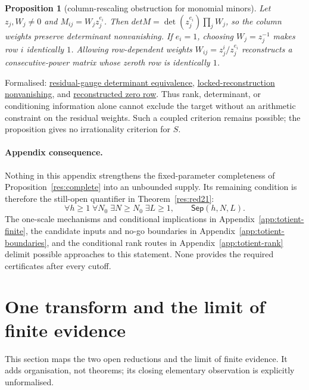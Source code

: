 \documentclass[11pt]{article}
\newcommand{\commit}{99f4bf47422abbd8757cbb22b50ba079d764d3a7}
\newcommand{\repobase}{https://github.com/wcook04/plectis-erdos/blob/\commit}
\newcommand{\PK}{Erdos249257}
\newcommand{\lword}[4]{\href{\repobase/\PK/#1\#L#2}{#4}}
\newtheorem{proposition}[theorem]{Proposition}
\theoremstyle{definition}
\theoremstyle{remark}
\begin{document}
{\begin{proposition}[column-rescaling obstruction for monomial minors]\label{res:residualgauge}
Let $z_j,W_j\ne0$ and $M_{ij}=W_jz_j^{e_i}$.  Then
\(det M=\det(z_j^{e_i})\prod_jW_j\), so the column weights preserve
determinant nonvanishing.  If $e_i=1$, choosing $W_j=z_j^{-1}$ makes row $i$
identically $1$.  Allowing row-dependent weights
$W_{ij}=z_j^i/z_j^{e_i}$ reconstructs a consecutive-power matrix whose
zeroth row is identically $1$.
\end{proposition}
\noindent Formalised:
\lword{ResidualGaugeObstruction.lean}{55}{det_residualMonomialMatrix_ne_zero_iff}{residual-gauge determinant equivalence},
\lword{ResidualGaugeObstruction.lean}{94}{locked_reconstruction_preserves_nonzero_minor}{locked-reconstruction nonvanishing}, and
\lword{ResidualGaugeObstruction.lean}{145}{rowReconstruction_zero_row_one}{reconstructed zero row}.
Thus rank, determinant, or conditioning information alone cannot exclude the
target without an arithmetic constraint on the residual weights.  Such a
coupled criterion remains possible; the proposition gives no irrationality
criterion for $S$.

\paragraph{Appendix consequence.}
Nothing in this appendix strengthens the fixed-parameter completeness of
Proposition~\ref{res:complete} into an unbounded supply.  Its remaining condition is
therefore the still-open quantifier in Theorem~\ref{res:red21}:
\[
 \forall h\geq1\;\forall N_0\;\exists N\geq N_0\;\exists L\geq1,\qquad
 \mathsf{Sep}(h,N,L).
\]
The one-scale mechanisms and conditional implications in
Appendix~\ref{app:totient-finite}, the candidate inputs and no-go boundaries
in Appendix~\ref{app:totient-boundaries}, and the conditional rank routes in
Appendix~\ref{app:totient-rank} delimit possible approaches to this
statement.  None provides the required certificates after every cutoff.

}

\section{One transform and the limit of finite evidence}
\label{sec:architecture}

\noindent This section maps the two open reductions and the limit of finite
evidence.  It adds organisation, not theorems; its closing elementary
observation is explicitly unformalised.
\end{document}
